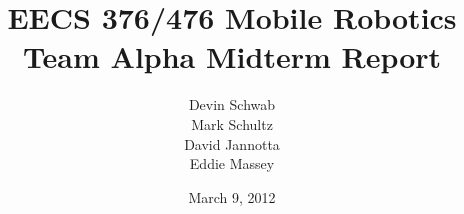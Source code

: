 \documentclass[10pt,letterpaper,final]{report}
\author{Devin Schwab\\
  Mark Schultz\\
  David Jannotta\\
  Eddie Massey}
\title{EECS 376/476 Mobile Robotics\\
  Team Alpha Midterm Report} \date{March 9, 2012}
\begin{document}

\listoftodos
\maketitle

\tableofcontents
\newpage











\end{document}
